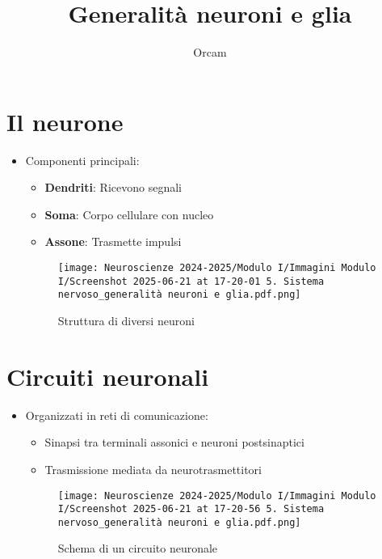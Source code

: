 \documentclass{article}
\title{Generalità neuroni e glia}
\author{Orcam}
\date{}
\begin{document}
\maketitle

\section{Il neurone}
\begin{itemize}
\item Componenti principali:
  \begin{itemize}
  \item \textbf{Dendriti}: Ricevono segnali
  \item \textbf{Soma}: Corpo cellulare con nucleo
  \item \textbf{Assone}: Trasmette impulsi
  \end{itemize}

\begin{figure}[h]
\centering
\texttt{[image: Neuroscienze 2024-2025/Modulo I/Immagini Modulo I/Screenshot 2025-06-21 at 17-20-01 5. Sistema nervoso\_generalità neuroni e glia.pdf.png]}
\caption{Struttura di diversi neuroni}
\label{fig:neurone}
\end{figure}
\end{itemize}

\section{Circuiti neuronali}
\begin{itemize}
\item Organizzati in reti di comunicazione:
  \begin{itemize}
  \item Sinapsi tra terminali assonici e neuroni postsinaptici
  \item Trasmissione mediata da neurotrasmettitori
  \end{itemize}

\begin{figure}[h]
\centering
\texttt{[image: Neuroscienze 2024-2025/Modulo I/Immagini Modulo I/Screenshot 2025-06-21 at 17-20-56 5. Sistema nervoso\_generalità neuroni e glia.pdf.png]}
\caption{Schema di un circuito neuronale}
\label{fig:circuito}
\end{figure}
\end{itemize}

\end{document}
